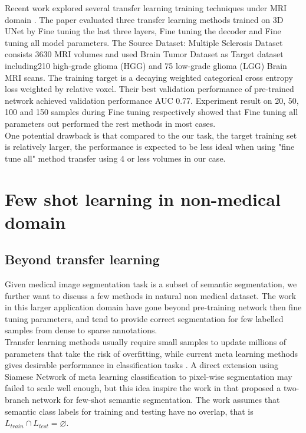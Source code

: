 Recent work explored several transfer learning training techniques under MRI domain \cite{wang_improving_2019}. The paper evaluated three transfer learning methods trained on 3D UNet by Fine tuning the last three layers, Fine tuning the decoder and Fine tuning all model parameters. 
The Source Dataset: Multiple Sclerosis Dataset consists 3630 MRI volumes and used Brain Tumor Dataset as Target dataset including210 high-grade glioma (HGG) and 75 low-grade glioma (LGG) Brain MRI scans. The training target is a decaying weighted categorical cross entropy loss weighted by relative voxel. Their best validation performance of pre-trained network achieved validation performance AUC 0.77. Experiment result on 20, 50, 100 and 150 samples during Fine tuning respectively showed that Fine tuning all parameters out performed the rest methods in most cases.\\

One potential drawback is that compared to the our task, the target training set is relatively larger, the performance is expected to be less ideal when using "fine tune all" method transfer using 4 or less volumes in our case.

\section{Few shot learning in non-medical domain}
\subsection{Beyond transfer learning}
Given medical image segmentation task is a subset of semantic segmentation, we  further want to discuss a few methods in natural non medical dataset. The work in this larger application domain have gone beyond pre-training network then fine tuning parameters, and tend to provide correct segmentation for few labelled samples from dense to sparse annotations.\\

Transfer learning methods usually require small samples to update millions of parameters that take the risk of overfitting, while current meta learning methods gives desirable performance in classification tasks \cite{shaban_one-shot_2017}. A direct extension using Siamese Network of meta learning classification to pixel-wise segmentation may failed to scale well enough, but this idea inspire the work in \cite{shaban_one-shot_2017} that proposed a two-branch network for few-shot semantic segmentation. The work assumes that semantic class labels for training and testing have no overlap, that is $L_{train} \cap L_{test}= \varnothing$.








